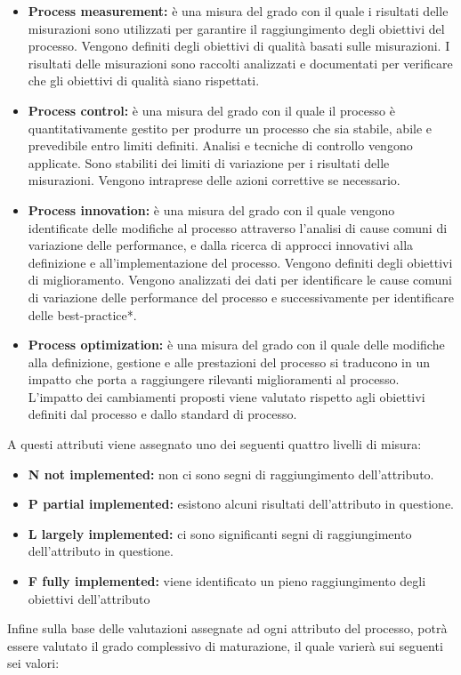 \documentclass[11pt,a4paper]{article}
\begin{document}
{\begin{itemize}
	\item \textbf{Process measurement:} è una misura del grado con il quale i risultati delle misurazioni sono utilizzati per garantire il raggiungimento degli obiettivi del processo. Vengono definiti degli obiettivi di qualità basati sulle misurazioni. I risultati delle misurazioni sono raccolti analizzati e documentati per verificare che gli obiettivi di qualità siano rispettati.
	\item \textbf{Process control:} è una misura del grado con il quale il processo è quantitativamente gestito per produrre un processo che sia stabile, abile e prevedibile entro limiti definiti. Analisi e tecniche di controllo vengono applicate. Sono stabiliti dei limiti di variazione per i risultati delle misurazioni. Vengono intraprese delle azioni correttive se necessario. 
	\item \textbf{Process innovation:} è una misura del grado con il quale vengono identificate delle modifiche al processo attraverso l'analisi di cause comuni di variazione delle performance, e dalla ricerca di approcci innovativi alla definizione e all'implementazione del processo. Vengono definiti degli obiettivi di miglioramento. Vengono analizzati dei dati per identificare le cause comuni di variazione delle performance del processo e successivamente per identificare delle best-practice*.
	\item \textbf{Process optimization:} è una misura del grado con il quale delle modifiche alla definizione, gestione e alle prestazioni del processo si traducono in un impatto che porta a raggiungere rilevanti miglioramenti al processo. L'impatto dei cambiamenti proposti viene valutato rispetto agli obiettivi definiti dal processo e dallo standard di processo.
\end{itemize}
A questi attributi viene assegnato uno dei seguenti quattro livelli di misura:
\begin{itemize}
	\item \textbf{N not implemented:} non ci sono segni di raggiungimento dell'attributo.
	\item \textbf{P partial implemented:} esistono alcuni risultati dell'attributo in questione.
	\item \textbf{L largely implemented:} ci sono significanti segni di raggiungimento dell'attributo in questione.
	\item \textbf{F fully implemented:} viene identificato un pieno raggiungimento degli obiettivi dell'attributo
\end{itemize}
Infine sulla base delle valutazioni assegnate ad ogni attributo del processo, potrà essere valutato il grado complessivo di maturazione, il quale varierà sui seguenti sei valori:
}
\end{document}
